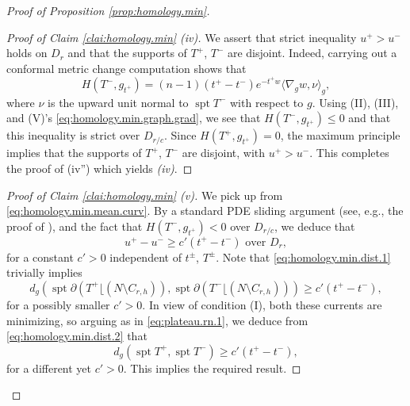 \documentclass[11pt, letterpaper, reqno]{amsart}
\numberwithin{equation}{section}
\theoremstyle{remark}
\newcommand{\spt}{\operatorname{spt}}
\newcommand{\mres}{\lfloor}
\begin{document}
\begin{proof}[Proof of Proposition \ref{prop:homology.min}]
\begin{proof}[Proof of Claim \ref{clai:homology.min} (iv)]
		We assert that strict inequality $u^+ > u^-$ holds on $D_r$ and that the supports of $T^+$, $T^-$ are disjoint. Indeed, carrying out a conformal metric change computation shows that
		\begin{equation} \label{eq:homology.min.mean.curv}
			H(T^-, g_{t^+}) = (n-1) (t^+-t^-) e^{-t^+ w} \langle \nabla_{g} w, \nu \rangle_g,
		\end{equation}
		where $\nu$ is the upward unit normal to $\spt T^-$ with respect to $g$. Using (II), (III), and (V)'s \eqref{eq:homology.min.graph.grad}, we see that $H(T^-, g_{t^+}) \leq 0$ and that this inequality is strict over $D_{r/c}$. Since $H(T^+, g_{t^+}) = 0$, the maximum principle implies that the supports of $T^+$, $T^-$ are disjoint, with $u^+ > u^-$. This completes the proof of (iv'') which yields \emph{(iv)}.
	\end{proof}
	
	\begin{proof}[Proof of Claim \ref{clai:homology.min} (v)]	
		We pick up from \eqref{eq:homology.min.mean.curv}. By a standard PDE sliding argument (see, e.g., the proof of \cite[Proposition 5.6 (f)]{CMS:generic.9.10}), and the fact that $H(T^-, g_{t^+}) < 0$ over $D_{r/c}$, we deduce that
		\begin{equation} \label{eq:homology.min.dist.1}
			u^+ - u^- \geq c'(t^+-t^-) \text{ over } D_{r},
		\end{equation}
		for a constant $c' > 0$ independent of $t^\pm$, $T^\pm$. Note that \eqref{eq:homology.min.dist.1} trivially implies
		\begin{equation} \label{eq:homology.min.dist.2}
			d_{g}(\spt \partial (T^+ \mres (N \setminus C_{r,h})), \spt \partial (T^- \mres (N \setminus C_{r,h}))) \geq c'(t^+-t^-),
		\end{equation}
		for a possibly smaller $c' > 0$. In view of condition (I), both these currents are minimizing, so arguing as in \eqref{eq:plateau.rn.1}, we deduce from \eqref{eq:homology.min.dist.2} that
		\begin{equation} \label{eq:homology.min.dist.3}
			d_{g}(\spt T^+, \spt T^-) \geq c'(t^+-t^-),
		\end{equation}
		for a different yet $c' > 0$. This implies the required result.
	\end{proof}
	

\end{proof}
\end{document}
